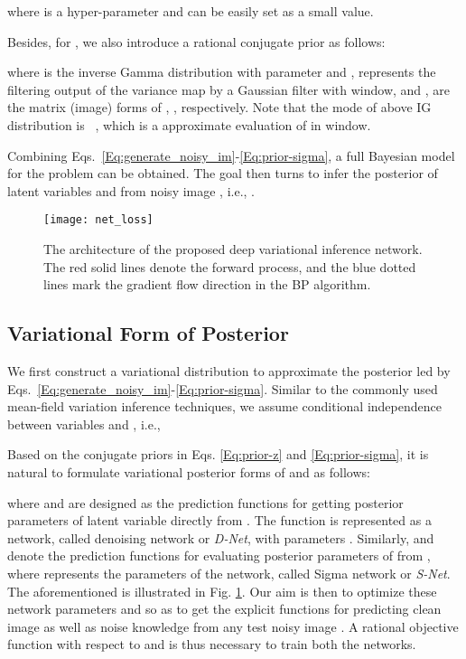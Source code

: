 \documentclass{article}
\begin{document}
where  is a hyper-parameter and can be easily set as a small value.

Besides, for , we also introduce a rational
conjugate prior as follows:

where  is the inverse Gamma distribution with parameter  and ,
 represents the filtering output of the
variance map  by a Gaussian filter with  window,
and ,  are the matrix (image) forms of ,
, respectively. Note that the mode of above
IG distribution is ~\cite{bishop2006pattern,yong2017robust}, which is a approximate evaluation of  in  window.

Combining Eqs.~\eqref{Eq:generate_noisy_im}-\eqref{Eq:prior-sigma}, a full Bayesian model for the problem can be obtained.
The goal then turns to
infer the posterior of latent variables  and
 from noisy image , i.e., .

\begin{figure}[t]
    \centering
\texttt{[image: net\_loss]}
    \vspace{-3mm}
    \caption{\small{The architecture of the proposed deep variational inference network.
    The red solid lines denote the forward process, and the blue dotted lines mark the gradient
    flow direction in the BP algorithm.}}
    \label{fig:net-loss}\vspace{-4mm}
\end{figure}

\vspace{-2mm}\subsection{Variational Form of Posterior}\vspace{-2mm}
We first construct a variational distribution  to approximate the
posterior  led by Eqs.~\eqref{Eq:generate_noisy_im}-\eqref{Eq:prior-sigma}. Similar to
the commonly used mean-field variation inference techniques, we assume
conditional independence between variables  and , i.e.,

Based on the conjugate priors in Eqs. \eqref{Eq:prior-z} and \eqref{Eq:prior-sigma}, it is natural to
formulate variational posterior forms of  and  as follows:

where  and  are designed as the prediction functions for getting
posterior parameters of latent variable  directly from . The function is represented as a network,
called denoising network or \textit{D-Net}, with parameters . Similarly,  and
 denote the prediction functions for evaluating posterior parameters of
 from , where  represents the parameters of the network, called Sigma network or \textit{S-Net}.
The aforementioned is illustrated in Fig. \ref{fig:net-loss}. Our aim is then to optimize
these network parameters  and  so as to get the explicit functions for predicting clean image
 as well as noise knowledge  from any test noisy image . A rational objective
function with respect to  and  is thus necessary
to train both the networks.
\end{document}
